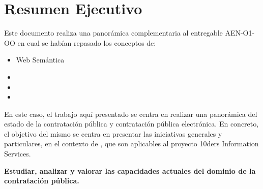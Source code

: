 \chapter*{Resumen Ejecutivo}
\thispagestyle{empty}
Este documento realiza una panorámica complementaria al entregable AEN-O1-OO en cual se habían 
repasado los conceptos de:

\begin{itemize}
 \item Web Semántica
 \item\linkeddata
 \item \opendata
 \item \lod
\end{itemize}

En este caso, el trabajo aquí presentado se centra en realizar una panorámica del estado 
de la contratación pública y contratación pública electrónica. En concreto,  el objetivo del mismo 
se centra en presentar las iniciativas generales y particulares, en el contexto de \eproc, 
que son aplicables al proyecto 10ders Information Services. 

\begin{Frame}
\textbf{Estudiar, analizar y valorar las capacidades actuales del dominio de la contratación pública.}
\end{Frame}


